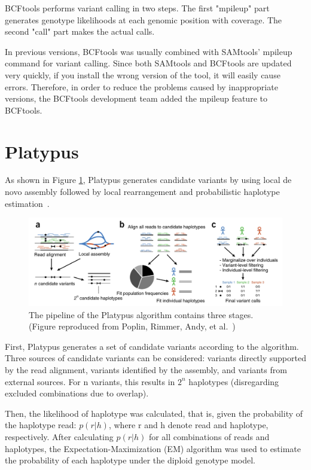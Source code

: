 \documentclass[PhD]{PHlab-thesis}
\begin{document}
BCFtools performs variant calling in two steps. The first "mpileup" part generates genotype likelihoods at each genomic position with coverage. The second "call" part makes the actual calls.

In previous versions, BCFtools was usually combined with SAMtools' mpileup command for variant calling. Since both SAMtools and BCFtools are updated very quickly, if you install the wrong version of the tool, it will easily cause errors. Therefore, in order to reduce the problems caused by inappropriate versions, the BCFtools development team added the mpileup feature to BCFtools.

\section{Platypus}
As shown in Figure \ref{fig:Platypus}, Platypus generates candidate variants by using local de novo assembly followed by local rearrangement and probabilistic haplotype estimation~\cite{Rimmer2014Platypus}.

\begin{figure}[h!]
	\centering
	\includegraphics[scale=0.4]{figures/Platypus.png}
	\caption{The pipeline of the Platypus algorithm contains three stages. (Figure reproduced from Poplin, Rimmer, Andy, et al.~\cite{Poplin2018GH})}
	\label{fig:Platypus} %
\end{figure}

First, Platypus generates a set of candidate variants according to the algorithm. Three sources of candidate variants can be considered: variants directly supported by the read alignment, variants identified by the assembly, and variants from external sources. For n variants, this results in $2^{n}$ haplotypes (disregarding excluded combinations due to overlap).

Then, the likelihood of haplotype was calculated, that is, given the probability of the haplotype read: $p(r|h)$, where r and h denote read and haplotype, respectively. After calculating $p(r|h)$ for all combinations of reads and haplotypes, the Expectation-Maximization (EM) algorithm was used to estimate the probability of each haplotype under the diploid genotype model.
\end{document}
